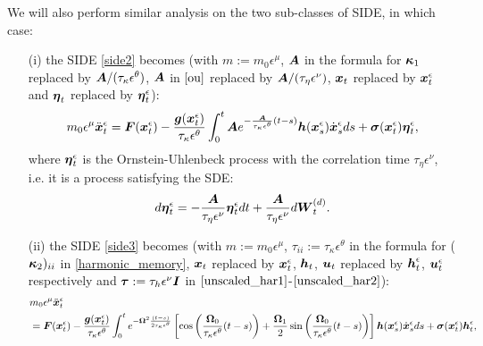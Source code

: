 We will also perform similar analysis on the two sub-classes of SIDE, in which case:
\begin{itemize}
\item[(i)] the SIDE \eqref{side2} becomes (with $m:=m_0 \epsilon^\mu$, $\boldsymbol{A}$ in the formula for $\boldsymbol{\kappa}_{1}$ replaced by $\boldsymbol{A}/(\tau_{\kappa} \epsilon^{\theta})$,  $\boldsymbol{A}$ in $\eqref{ou}$ replaced by $\boldsymbol{A}/(\tau_{\eta}\epsilon^{\nu})$, $\boldsymbol{x}_t$ replaced by $\boldsymbol{x}_t^\epsilon$ and $\boldsymbol{\eta}_{t}$ replaced by $\boldsymbol{\eta}_{t}^\epsilon$):  
\begin{equation} \label{goal2}
m_{0} \epsilon^{\mu} \ddot{\boldsymbol{x}}^{\epsilon}_{t} = \boldsymbol{F}(\boldsymbol{x}^\epsilon_{t}) - \frac{\boldsymbol{g}(\boldsymbol{x}^\epsilon_{t})}{\tau_{\kappa} \epsilon^{\theta}} \int_{0}^{t} \boldsymbol{A} e^{-\frac{\boldsymbol{A}}{\tau_{\kappa} \epsilon^{\theta}} (t-s)} \boldsymbol{h}(\boldsymbol{x}^\epsilon_{s}) \dot{\boldsymbol{x}}^{\epsilon}_{s} ds +  \boldsymbol{\sigma}(\boldsymbol{x}^\epsilon_{t}) \boldsymbol{\eta}^\epsilon_{t},
\end{equation} 
where  $\boldsymbol{\eta}^\epsilon_{t}$ is the Ornstein-Uhlenbeck process with the correlation time  $\tau_{\eta} \epsilon^{\nu}$, i.e. it is a  process satisfying the SDE:
\begin{equation} \label{rescaled-ou}
d\boldsymbol{\eta}^\epsilon_{t} = -\frac{\boldsymbol{A}}{\tau_{\eta} \epsilon^{\nu}}  \boldsymbol{\eta}^\epsilon_{t} dt + \frac{\boldsymbol{A}}{\tau_{\eta} \epsilon^{\nu}} d \boldsymbol{W}^{(d)}_{t}. 
\end{equation}
\item[(ii)] the SIDE \eqref{side3} becomes (with $m:=m_0 \epsilon^\mu$, $\tau_{ii} := \tau_{\kappa} \epsilon^{\theta}$ in the formula for ($\boldsymbol{\kappa}_{2})_{ii}$ in \eqref{harmonic_memory}, $\boldsymbol{x}_t$ replaced by $\boldsymbol{x}^\epsilon_t$,  $\boldsymbol{h}_{t}$, $\boldsymbol{u}_{t}$ replaced by $\boldsymbol{h}^\epsilon_{t}$, $\boldsymbol{u}^\epsilon_{t}$ respectively and $\boldsymbol{\tau} := \tau_{h} \epsilon^{\nu} \boldsymbol{I}$ in $\eqref{unscaled_har1}$-$\eqref{unscaled_har2}$): 
\begin{align} 
&m_{0} \epsilon^{\mu} \ddot{\vecc{x}}^\epsilon_{t} \nonumber \\ 
&= \vecc{F}(\vecc{x}^\epsilon_{t})  
- \frac{\vecc{g}(\vecc{x}^\epsilon_{t})}{\tau_{\kappa} \epsilon^{\theta}} \int_{0}^{t} e^{-\vecc{\Omega}^2\frac{(t-s)}{2\tau_{\kappa}\epsilon^{\theta}}}\left[\cos\left(\frac{\vecc{\Omega}_{0}}{\tau_{\kappa}\epsilon^{\theta}}(t-s) \right) + \frac{\vecc{\Omega}_{1}}{2} \sin\left(\frac{\vecc{\Omega}_{0}}{\tau_{\kappa}\epsilon^{\theta}}(t-s) \right) \right] \vecc{h}(\vecc{x}^\epsilon_{s}) \dot{\vecc{x}}^{\epsilon}_{s} ds  +  \vecc{\sigma}(\vecc{x}^\epsilon_{t}) \vecc{h}^\epsilon_{t}, \label{goal3}

\end{align}
\end{itemize}
